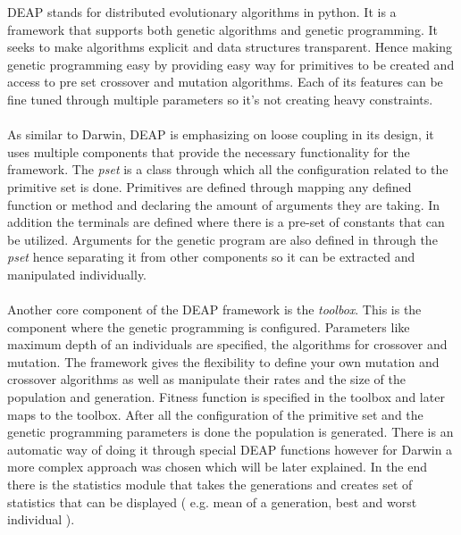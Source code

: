 DEAP stands for distributed evolutionary algorithms in python. It is a framework that supports both genetic algorithms and genetic programming.
It seeks to make algorithms explicit and data structures transparent. Hence making genetic programming easy by providing easy way for primitives
to be created and access to pre set crossover and mutation algorithms. Each of its features can be fine tuned through multiple parameters so it's not creating
heavy constraints.
\paragraph{}
As similar to Darwin, DEAP is emphasizing on loose coupling in its design, it uses multiple components that provide the necessary functionality
for the framework. The \textit{pset} is a class through which all the configuration related to the primitive set is done. Primitives are defined
through mapping any defined function or method and declaring the amount of arguments they are taking. In addition the terminals are defined where
there is a pre-set of constants that can be utilized. Arguments for the genetic program are also defined in through the \textit{pset} hence 
separating it from other components so it can be extracted and manipulated individually.
\paragraph{}
Another core component of the DEAP framework is the \textit{toolbox}. This is the component where the genetic programming is configured. Parameters
like maximum depth of an individuals are specified, the algorithms for crossover and mutation. The framework gives the flexibility to define your
own mutation and crossover algorithms as well as manipulate their rates and the size of the population and generation. Fitness function is specified in the toolbox 
and later maps to the toolbox. After all the configuration of the primitive set and the genetic
programming parameters is done the population is generated. There is an automatic way of doing it through special DEAP functions however for Darwin
a more complex approach was chosen which will be later explained. In the end there is the statistics module that takes the generations and creates
set of statistics that can be displayed ( e.g. mean of a generation, best and worst individual ).

